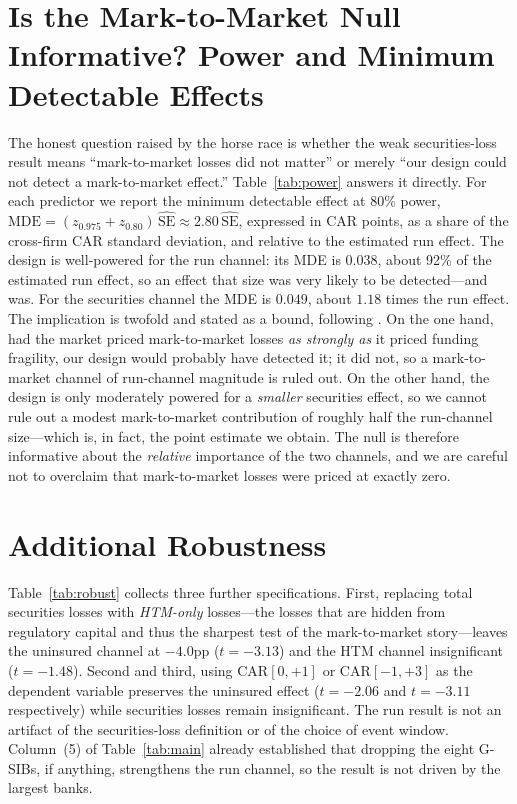 \documentclass[12pt]{article}
\begin{document}
\section{Is the Mark-to-Market Null Informative? Power and Minimum Detectable Effects}\label{sec:power}
The honest question raised by the horse race is whether the weak securities-loss result means
``mark-to-market losses did not matter'' or merely ``our design could not detect a
mark-to-market effect.'' Table~\ref{tab:power} answers it directly. For each predictor we
report the minimum detectable effect at 80\% power,
$\text{MDE}=(z_{0.975}+z_{0.80})\,\widehat{\text{SE}}\approx 2.80\,\widehat{\text{SE}}$,
expressed in CAR points, as a share of the cross-firm CAR standard deviation, and relative to
the estimated run effect. The design is well-powered for the run channel: its MDE is $0.038$,
about 92\% of the estimated run effect, so an effect that size was very likely to be
detected---and was. For the securities channel the MDE is $0.049$, about $1.18$ times the run
effect. The implication is twofold and stated as a bound, following \citet{abadie2020}. On
the one hand, had the market priced mark-to-market losses \emph{as strongly as} it priced
funding fragility, our design would probably have detected it; it did not, so a mark-to-market
channel of run-channel magnitude is ruled out. On the other hand, the design is only
moderately powered for a \emph{smaller} securities effect, so we cannot rule out a modest
mark-to-market contribution of roughly half the run-channel size---which is, in fact, the
point estimate we obtain. The null is therefore informative about the \emph{relative}
importance of the two channels, and we are careful not to overclaim that mark-to-market
losses were priced at exactly zero.

\section{Additional Robustness}\label{sec:robust}
Table~\ref{tab:robust} collects three further specifications. First, replacing total
securities losses with \emph{HTM-only} losses---the losses that are hidden from regulatory
capital and thus the sharpest test of the mark-to-market story---leaves the uninsured channel
at $-4.0$pp ($t=-3.13$) and the HTM channel insignificant ($t=-1.48$). Second and third,
using CAR$[0,+1]$ or CAR$[-1,+3]$ as the dependent variable preserves the uninsured effect
($t=-2.06$ and $t=-3.11$ respectively) while securities losses remain insignificant. The run
result is not an artifact of the securities-loss definition or of the choice of event window.
Column~(5) of Table~\ref{tab:main} already established that dropping the eight G-SIBs, if
anything, strengthens the run channel, so the result is not driven by the largest banks.
\end{document}
